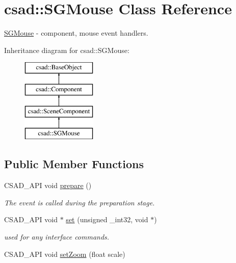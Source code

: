 \hypertarget{classcsad_1_1_s_g_mouse}{\section{csad\-:\-:S\-G\-Mouse Class Reference}
\label{classcsad_1_1_s_g_mouse}
}


\hyperlink{classcsad_1_1_s_g_mouse}{S\-G\-Mouse} -\/ component, mouse event handlers.  


Inheritance diagram for csad\-:\-:S\-G\-Mouse\-:\begin{figure}[H]
\begin{center}
\leavevmode
\includegraphics[height=4.000000cm]{classcsad_1_1_s_g_mouse}
\end{center}
\end{figure}
\subsection*{Public Member Functions}
\begin{DoxyCompactItemize}
\item 
\hypertarget{classcsad_1_1_s_g_mouse_a35dc2a65e9f0457a9983a85fa3a9cb88}{C\-S\-A\-D\-\_\-\-A\-P\-I void \hyperlink{classcsad_1_1_s_g_mouse_a35dc2a65e9f0457a9983a85fa3a9cb88}{prepare} ()}\label{classcsad_1_1_s_g_mouse_a35dc2a65e9f0457a9983a85fa3a9cb88}

\begin{DoxyCompactList}\small\item\em The event is called during the preparation stage. \end{DoxyCompactList}\item 
\hypertarget{classcsad_1_1_s_g_mouse_a65eebbd5eb437c2d93c0dcc1aae3f167}{C\-S\-A\-D\-\_\-\-A\-P\-I void $\ast$ \hyperlink{classcsad_1_1_s_g_mouse_a65eebbd5eb437c2d93c0dcc1aae3f167}{set} (unsigned \-\_\-int32, void $\ast$)}\label{classcsad_1_1_s_g_mouse_a65eebbd5eb437c2d93c0dcc1aae3f167}

\begin{DoxyCompactList}\small\item\em used for any interface commands. \end{DoxyCompactList}\item 
C\-S\-A\-D\-\_\-\-A\-P\-I void \hyperlink{classcsad_1_1_s_g_mouse_ae759f467750f0a48749da3ec2d037269}{set\-Zoom} (float scale)
\end{DoxyCompactItemize}
